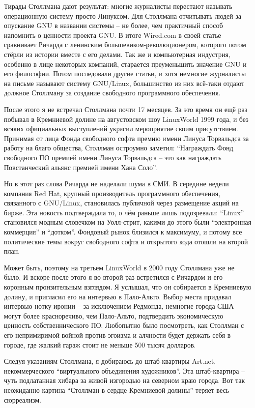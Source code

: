 Тирады Столлмана дают результат: многие журналисты перестают называть операционную систему просто Линуксом. Для Столлмана отчитывать людей за опускание GNU в названии системы  -- не более, чем практичный способ напомнить о ценности проекта GNU. В итоге Wired.com в своей статье сравнивает Ричарда с ленинским большевиком-революционером, которого потом стёрли из истории вместе с его делами. Так же и компьютерная индустрия, особенно в лице некоторых компаний, старается преуменьшить значение GNU и его философии. Потом последовали другие статьи, и хотя немногие журналисты на письме называют систему GNU/Linux, большинство из них всё-таки отдают должное Столлману за создание свободного программного обеспечения.

После этого я не встречал Столлмана почти 17 месяцев. За это время он ещё раз побывал в Кремниевой долине на августовском шоу LinuxWorld 1999 года, и без всяких официальных выступлений украсил мероприятие своим присутствием. Принимая от лица Фонда свободного софта премию имени Линуса Торвальдса за работу на благо общества, Столлман остроумно заметил: \enquote{Награждать Фонд свободного ПО премией имени Линуса Торвальдса -- это как награждать Повстанческий альянс премией имени Хана Соло}.

Но в этот раз слова Ричарда не наделали шума в СМИ. В середине недели компания Red Hat, крупный производитель программного обеспечения, связанного с GNU/Linux, становилась публичной через размещение акций на бирже. Эта новость подтверждала то, о чём раньше лишь подозревали: \enquote{Linux} становился модным словечком на Уолл-стрит, какими до этого были \enquote{электронная коммерция} и \enquote{дотком}. Фондовый рынок близился к максимуму, и потому все политические темы вокруг свободного софта и открытого кода отошли на второй план.

Может быть, поэтому на третьем LinuxWorld в 2000 году Столлмана уже не было. И вскоре после этого я во второй раз встретился с Ричардом и его коронным пронзительным взглядом. Я услышал, что он собирается в Кремниевую долину, и пригласил его на интервью в Пало-Альто. Выбор места придавал интервью нотку иронии -- за исключением Редмонда, немногие города США могут более красноречиво, чем Пало-Альто, подтвердить экономическую ценность собственнического ПО. Любопытно было посмотреть, как Столлман с его непримиримой войной против эгоизма и алчности будет держать себя в городе, где жалкий гараж стоит не меньше 500 тысяч долларов.

Следуя указаниям Столлмана, я добираюсь до штаб-квартиры Art.net, некоммерческого \enquote{виртуального объединения художников}. Эта штаб-квартира -- чуть подлатанная хибара за живой изгородью на северном краю города. Вот так неожиданно картина \enquote{Столлман в сердце Кремниевой долины} теряет весь сюрреализм.


